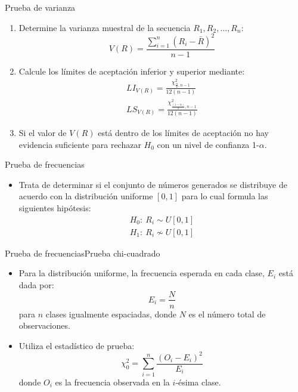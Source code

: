 \begin{frame}{Prueba de varianza}
    \begin{enumerate}
        \item Determine la varianza muestral de la secuencia $R_1, R_2, \dots, R_n$: \begin{equation*}
            V(R)=\frac{\displaystyle{\sum_{i=1}^{n}{(R_i-\bar{R})^2}}}{n-1}
        \end{equation*}
        \item Calcule los límites de aceptación inferior y superior mediante: 
                \begin{eqnarray*}
                    LI_{V(R)}=\frac{\chi^2_{\frac{\alpha}{2},n-1}}{12(n-1)}\\
                    LS_{V(R)}=\frac{\chi^2_{\frac{(1-\alpha)}{2},n-1}}{12(n-1)}
                \end{eqnarray*}
        \item Si el valor de $V(R)$ está dentro de los límites de aceptación no hay evidencia suficiente para rechazar $H_0$ con un nivel de confianza 1-$\alpha$. 
    \end{enumerate}
\end{frame}

\begin{frame}{Prueba de frecuencias}
    \begin{itemize}
        \item Trata de determinar si el conjunto de números generados se distribuye de acuerdo con la distribución uniforme $\left[0,1\right]$ para lo cual formula las siguientes hipótesis:
        \begin{eqnarray*}
            H_0:~R_i \sim U\left[0,1\right]\\
            H_1:~R_i \not\sim U\left[0,1\right]
        \end{eqnarray*}
    \end{itemize}
\end{frame}

\begin{frame}{Prueba de frecuencias}{Prueba chi-cuadrado}
    \begin{itemize}
        \item Para la distribución uniforme, la frecuencia esperada en cada clase, $E_i$ está dada por: 
        \begin{equation*}
            E_i=\frac{N}{n}
        \end{equation*}
       para  $n$ clases igualmente espaciadas, donde $N$ es el número total de observaciones.
        \item Utiliza el estadístico de prueba:
    \begin{equation*}
        \chi_0^2=\sum_{i=1}^{n}{\frac{\left(O_i-E_i\right)^2}{E_i}}
    \end{equation*}
    donde $O_i$ es la frecuencia observada en la $i$-ésima clase. 
    \end{itemize}
\end{frame}

